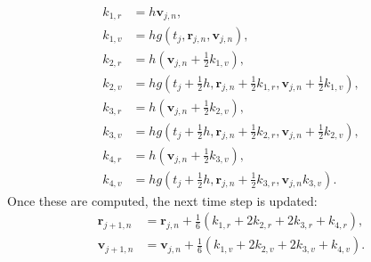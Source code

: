 \documentclass[english,notitlepage,reprint]{revtex4-2}  %
\renewcommand{\vec}[1]{\mathbf{#1}}
\begin{document}
\begin{subequations}    \label{eq:RK4_ks}
    \begin{align}
     k_{1,r} &= h\vec{v}_{j,n}, \\ 
     k_{1,v} &= hg(t_j, \vec{r}_{j,n}, \vec{v}_{j,n}), \\ 
     k_{2,r} &= h(\vec{v}_{j,n} + \frac{1}{2}k_{1,v}), \\ 
     k_{2,v} &= hg(t_j+\frac{1}{2}h, \vec{r}_{j,n} + \frac{1}{2}k_{1,r}, \vec{v}_{j,n} + \frac{1}{2}k_{1,v}), \\
     k_{3,r} &= h(\vec{v}_{j,n} + \frac{1}{2}k_{2,v}), \\ 
     k_{3,v} &= hg(t_j+\frac{1}{2}h, \vec{r}_{j,n} + \frac{1}{2}k_{2,r}, \vec{v}_{j,n} + \frac{1}{2}k_{2,v}), \\
     k_{4,r} &= h(\vec{v}_{j,n} + \frac{1}{2}k_{3,v}), \\ 
     k_{4,v} &= hg(t_j+\frac{1}{2}h, \vec{r}_{j,n} + \frac{1}{2}k_{3,r}, \vec{v}_{j,n} k_{3,v}).
    \end{align}
\end{subequations}
Once these are computed, the next time step is updated: 
\begin{subequations}    \label{eq:RK4_update_rv}
\begin{align} 
     \vec{r}_{j+1,n} &= \vec{r}_{j,n} + \frac{1}{6}(k_{1,r} + 2k_{2,r} + 2k_{3,r} + k_{4,r}), \\ 
     \vec{v}_{j+1,n} &= \vec{v}_{j,n} + \frac{1}{6}(k_{1,v} + 2k_{2,v} + 2k_{3,v} + k_{4,v}).
\end{align}
\end{subequations}


\end{document}

